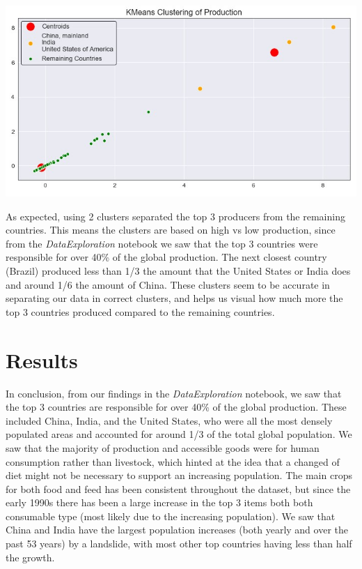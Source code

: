 \documentclass[12pt, a4paper]{article}
\begin{document}
\begin{spacing}{1.1}

	\begin{center}
	\includegraphics[scale=.8]{kmeans}
	\end{center}
	As expected, using 2 clusters separated the top 3 producers from the remaining countries. This means the clusters are based on high vs low production, since from the \textit{DataExploration} notebook we saw that the top 3 countries were responsible for over 40\% of the global production. The next closest country (Brazil) produced less than 1/3 the amount that the United States or India does and around 1/6 the amount of China. These clusters seem to be accurate in separating our data in correct clusters, and helps us visual how much more the top 3 countries produced compared to the remaining countries.\vspace*{2mm}
	
	\section{Results}
	In conclusion, from our findings in the \textit{DataExploration} notebook, we saw that the top 3 countries are responsible for over 40\% of the global production. These included China, India, and the United States, who were all the most densely populated areas and accounted for around 1/3 of the total global population. We saw that the majority of production and accessible goods were for human consumption rather than livestock, which hinted at the idea that a changed of diet might not be necessary to support an increasing population. The main crops for both food and feed has been consistent throughout the dataset, but since the early 1990s there has been a large increase in the top 3 items both both consumable type (most likely due to the increasing population). We saw that China and India have the largest population increases (both yearly and over the past 53 years) by a landslide, with most other top countries having less than half the growth. \newpage
	

\end{spacing}
\end{document}
